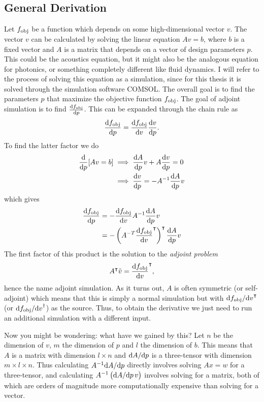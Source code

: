 \subsection{General Derivation}\label{sec:general_derivation}


Let $f_\text{obj}$ be a function which depends on some high-dimensional vector $v$.
The vector $v$ can be calculated by solving the linear equation
$A v = b$, where $b$ is a fixed vector and $A$ is a matrix that depends on a
vector of design parameters $p$.
This could be the acoustics equation, but it might also be the analogous
equation for photonics, or something completely different like fluid dynamics.
I will refer to the process of solving this equation as a simulation, since for
this thesis it is solved through the simulation software COMSOL.
The overall goal is to find the parameters $p$ that maximize the objective
function $f_\text{obj}$.
The goal of adjoint simulation is to find $\diff{\fobj}{p}$.
This can be expanded through the chain rule as
\begin{equation}
	\diff{\fobj}{p} = \diff{\fobj}{v} \diff{v}{p}.
\end{equation}
To find the latter factor we do
\begin{align}
	\diff{}{p} [Av = b] &\implies \diff{A}{p} v + A \diff{v}{p} = 0\\
						&\implies \diff{v}{p} = -A^{-1} \diff{A}{p} v
\end{align}
which gives
\begin{align}
	\diff{\fobj}{p} &= - \diff{\fobj}{v} A^{-1} \diff{A}{p}
	v\label{eq:no_adj_sim}\\
	&= - \left(A^{-T} \diff{\fobj}{v}^\transpose \right)^\transpose \diff{A}{p} v
\end{align}
The first factor of this product is the solution to the \emph{adjoint problem}
\begin{equation}
	A^\transpose \tilde v = \diff{\fobj}{v}^\transpose,
\end{equation}
hence the name adjoint simulation.
As it turns out, $A$ is often symmetric (or self-adjoint) which means that this is simply a normal
simulation but with $\difs{\fobj}{v}^\transpose$ (or $\difs{\fobj}{v}^\dagger$) as the source.
Thus, to obtain the derivative we just need to run an additional
simulation with a different input.

Now you might be wondering: what have we gained by this?
Let $n$ be the dimension of $v$, $m$ the dimension of $p$ and $l$ the dimension
of $b$.
This means that $A$ is a matrix with dimension $l\times n$ and $\difs{A}{p}$ is
a three-tensor with dimension $m\times l\times n$.
Thus calculating $A^{-1} \difs{A}{p}$ directly involves solving $Ax = w$ for a
three-tensor, and calculating $A^{-1} \left(\difs{A}{p}\,v\right)$
involves solving for a matrix, both of which are orders of magnitude more
computationally expensive than solving for a vector.


